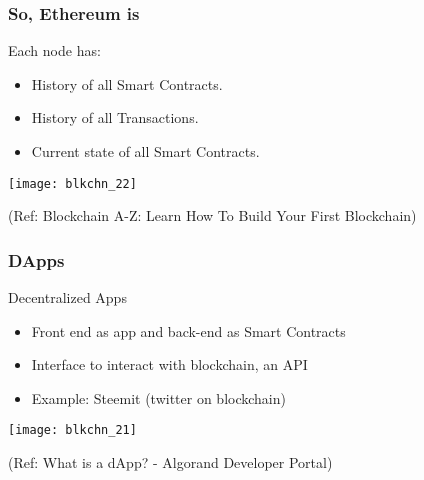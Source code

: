 \begin{frame}[fragile]\frametitle{So, Ethereum is}
Each node has:
\begin{itemize}
\item History of all Smart Contracts.
\item History of all Transactions.
\item Current state of all Smart Contracts.
\end{itemize}

\begin{center}
\texttt{[image: blkchn\_22]}

{\tiny (Ref: Blockchain A-Z: Learn How To Build Your First Blockchain)}
\end{center}

\end{frame}

\begin{frame}[fragile]\frametitle{DApps}
Decentralized Apps
\begin{itemize}
\item Front end as app and back-end as Smart Contracts
\item Interface to interact with blockchain, an API
\item Example: Steemit (twitter on blockchain)
\end{itemize}

\begin{center}
\texttt{[image: blkchn\_21]}

{\tiny (Ref: What is a dApp? - Algorand Developer Portal)}
\end{center}

\end{frame}

